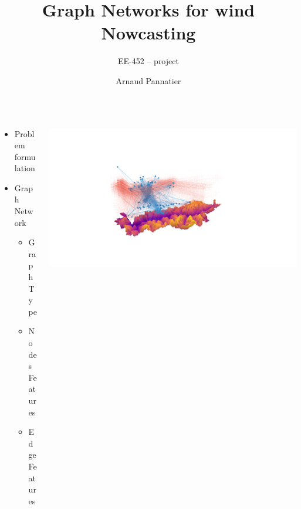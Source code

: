 \documentclass[aspectratio=169]{beamer}
\author[A. Pannatier]{Arnaud Pannatier}
\title{Graph Networks for wind Nowcasting}
\subtitle{EE-452 -- project}
\begin{document}
\maketitle

\begin{frame}
    \begin{columns}
        \begin{column}{0.4\textwidth}

            \begin{itemize}
                \item Problem formulation
                \item Graph Network
                      \begin{itemize}
                          \item Graph Type
                          \item Nodes Features
                          \item Edge Features
                      \end{itemize}
            \end{itemize}

        \end{column}
        \begin{column}{0.6\textwidth}
            \centering
            \includegraphics[trim={13cm 6cm 15cm 8cm},clip,width=\textwidth]{imgs/south-gen.png}
        \end{column}
    \end{columns}
\end{frame}
\end{document}

